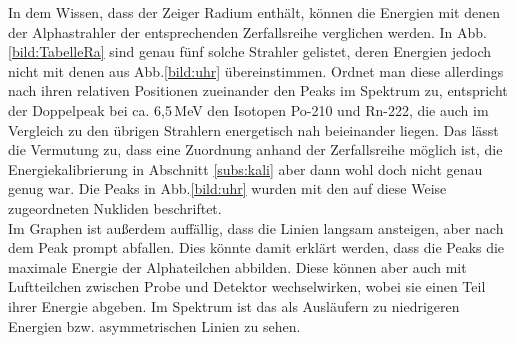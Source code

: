 In dem Wissen, dass der Zeiger Radium enthält, können die Energien mit denen der Alphastrahler der entsprechenden Zerfallsreihe verglichen werden. In Abb.\ref{bild:TabelleRa}
sind genau fünf solche Strahler gelistet, deren Energien jedoch nicht mit denen aus Abb.\ref{bild:uhr} übereinstimmen. Ordnet man diese allerdings nach ihren relativen Positionen 
zueinander den Peaks im Spektrum zu, entspricht der Doppelpeak bei ca. 6,5\,MeV den Isotopen Po-210 und Rn-222, die auch im Vergleich zu den übrigen Strahlern energetisch nah 
beieinander liegen. Das lässt die Vermutung zu, dass eine Zuordnung anhand der Zerfallsreihe möglich ist, die Energiekalibrierung in Abschnitt \ref{subs:kali} aber dann 
wohl doch nicht genau genug war. Die Peaks in Abb.\ref{bild:uhr} wurden mit den auf diese Weise zugeordneten Nukliden beschriftet.\\

Im Graphen ist außerdem auffällig, dass die Linien langsam ansteigen, aber nach dem Peak prompt abfallen. Dies könnte damit erklärt werden, dass 
die Peaks die maximale Energie der Alphateilchen abbilden. Diese können aber auch mit Luftteilchen zwischen Probe und Detektor wechselwirken, wobei 
sie einen Teil ihrer Energie abgeben. Im Spektrum ist das als Ausläufern zu niedrigeren Energien bzw. asymmetrischen Linien zu sehen. \\
